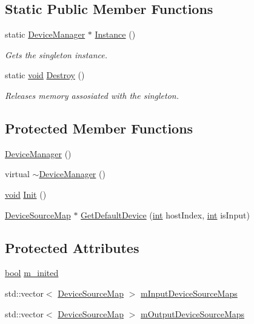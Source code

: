 \subsection*{Static Public Member Functions}
\begin{DoxyCompactItemize}
\item 
static \hyperlink{class_device_manager}{Device\+Manager} $\ast$ \hyperlink{class_device_manager_a94a8d55e502ee081ddbaaacd88b773b5}{Instance} ()
\begin{DoxyCompactList}\small\item\em Gets the singleton instance. \end{DoxyCompactList}\item 
static \hyperlink{sound_8c_ae35f5844602719cf66324f4de2a658b3}{void} \hyperlink{class_device_manager_a528cddfb2a23253a4207cc7359df0daf}{Destroy} ()
\begin{DoxyCompactList}\small\item\em Releases memory assosiated with the singleton. \end{DoxyCompactList}\end{DoxyCompactItemize}
\subsection*{Protected Member Functions}
\begin{DoxyCompactItemize}
\item 
\hyperlink{class_device_manager_a4e6d37b581df235b46c5696e6c71ae79}{Device\+Manager} ()
\item 
virtual \hyperlink{class_device_manager_ad91a247c8acfd51c533be52313ce7ddd}{$\sim$\+Device\+Manager} ()
\item 
\hyperlink{sound_8c_ae35f5844602719cf66324f4de2a658b3}{void} \hyperlink{class_device_manager_a6ec494556a021601d1b7b837e08e2825}{Init} ()
\item 
\hyperlink{struct_device_source_map}{Device\+Source\+Map} $\ast$ \hyperlink{class_device_manager_adbaf3b3c75e4529bb605d0309864366a}{Get\+Default\+Device} (\hyperlink{xmltok_8h_a5a0d4a5641ce434f1d23533f2b2e6653}{int} host\+Index, \hyperlink{xmltok_8h_a5a0d4a5641ce434f1d23533f2b2e6653}{int} is\+Input)
\end{DoxyCompactItemize}
\subsection*{Protected Attributes}
\begin{DoxyCompactItemize}
\item 
\hyperlink{mac_2config_2i386_2lib-src_2libsoxr_2soxr-config_8h_abb452686968e48b67397da5f97445f5b}{bool} \hyperlink{class_device_manager_a6d4b8ffa2f1946d8398961e7a69f4003}{m\+\_\+inited}
\item 
std\+::vector$<$ \hyperlink{struct_device_source_map}{Device\+Source\+Map} $>$ \hyperlink{class_device_manager_ae410235c68d0b3c1c9d71e34000828b8}{m\+Input\+Device\+Source\+Maps}
\item 
std\+::vector$<$ \hyperlink{struct_device_source_map}{Device\+Source\+Map} $>$ \hyperlink{class_device_manager_ae03c7aa6d83e7b322b635bd238f63207}{m\+Output\+Device\+Source\+Maps}
\end{DoxyCompactItemize}
